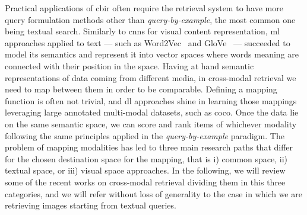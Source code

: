 Practical applications of \gls{cbir} often require the retrieval system to have more query formulation methods other than \emph{query-by-example}, the most common one being textual search.
Similarly to \glspl{cnn} for visual content representation, \gls{ml} approaches applied to text --- such as Word2Vec~\cite{mikolov2013distributed} and GloVe~\cite{pennington2014glove} --- succeeded to model its semantics and represent it into vector spaces where words meaning are connected with their position in the space.
Having at hand semantic representations of data coming from different media, in cross-modal retrieval we need to map between them in order to be comparable.
Defining a mapping function is often not trivial, and \gls{dl} approaches shine in learning those mappings leveraging large annotated multi-modal datasets, such as \gls{coco}.
Once the data lie on the same semantic space, we can score and rank items of whichever modality following the same principles applied in the \emph{query-by-example} paradigm.
The problem of mapping modalities has led to three main research paths that differ for the chosen destination space for the mapping, that is i) common space, ii) textual space, or iii) visual space approaches.
In the following, we will review some of the recent works on cross-modal retrieval dividing them in this three categories, and we will refer without loss of generality to the case in which we are retrieving images starting from textual queries. %

